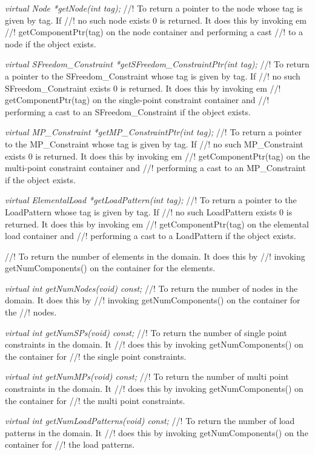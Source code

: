 {\em virtual  Node *getNode(int tag);}
//! To return a pointer to the node whose tag is given by \p tag. If
//! no such node exists $0$ is returned. It does this by invoking {em
//! getComponentPtr(tag)} on the node container and performing a cast
//! to a node if the object exists. 

{\em virtual  SFreedom\_Constraint *getSFreedom\_ConstraintPtr(int tag);}
//! To return a pointer to the SFreedom\_Constraint whose tag is given by \p tag. If
//! no such SFreedom\_Constraint exists $0$ is returned. It does this by invoking {em
//! getComponentPtr(tag)} on the single-point constraint container and
//! performing a cast to an SFreedom\_Constraint if the object exists. 


{\em virtual  MP\_Constraint *getMP\_ConstraintPtr(int tag);}
//! To return a pointer to the MP\_Constraint whose tag is given by \p tag. If
//! no such MP\_Constraint exists $0$ is returned. It does this by invoking {em
//! getComponentPtr(tag)} on the multi-point constraint container and
//! performing a cast to an MP\_Constraint if the object exists. 


{\em virtual  ElementalLoad *getLoadPattern(int tag);}
//! To return a pointer to the LoadPattern whose tag is given by \p tag. If
//! no such LoadPattern exists $0$ is returned. It does this by invoking {em
//! getComponentPtr(tag)} on the elemental load container and
//! performing a cast to a LoadPattern if the object exists. 


//! To return the number of elements in the domain. It does this by
//! invoking getNumComponents() on the container for the elements. 

{\em virtual int getNumNodes(void) const;}
//! To return the number of nodes in the domain. It does this by
//! invoking getNumComponents() on the container for the
//! nodes. 

{\em virtual int getNumSPs(void) const;}
//! To return the number of single point constraints in the domain. It
//! does this by invoking getNumComponents() on the container for
//! the single point constraints. 

{\em virtual int getNumMPs(void) const;}
//! To return the number of multi point constraints in the domain. It
//! does this by invoking getNumComponents() on the container for
//! the multi point constraints. 

{\em virtual int getNumLoadPatterns(void) const;}
//! To return the number of load patterns in the domain. It
//! does this by invoking getNumComponents() on the container for
//! the load patterns. 

